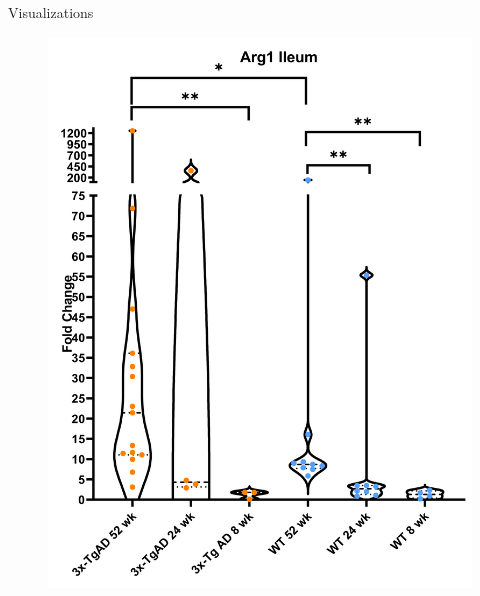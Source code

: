 \documentclass[final]{beamer}
\newlength{\colwidth}
\begin{document}
\begin{frame}[t]
\begin{columns}[t]
\begin{column}{\colwidth}
\begin{block}{Visualizations}
    \begin{figure}[!htb]
        \begin{center}
          \includegraphics[width=\linewidth]{assets/arg1_Ileum}
        \end{center}
      \endminipage
        \begin{center}

\end{center}
\end{figure}
\end{block}
\end{column}
\end{columns}
\end{frame}
\end{document}
